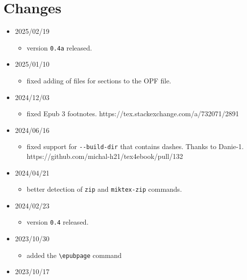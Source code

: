 \section{Changes}\label{changes}

\begin{itemize}
\item
  2025/02/19

  \begin{itemize}
  \tightlist
  \item
    version \texttt{0.4a} released.
  \end{itemize}
\item
  2025/01/10

  \begin{itemize}
  \tightlist
  \item
    fixed adding of files for sections to the OPF file.
  \end{itemize}
\item
  2024/12/03

  \begin{itemize}
  \tightlist
  \item
    fixed Epub 3 footnotes. https://tex.stackexchange.com/a/732071/2891
  \end{itemize}
\item
  2024/06/16

  \begin{itemize}
  \tightlist
  \item
    fixed support for \texttt{-\/-build-dir} that contains dashes.
    Thanks to Danie-1. https://github.com/michal-h21/tex4ebook/pull/132
  \end{itemize}
\item
  2024/04/21

  \begin{itemize}
  \tightlist
  \item
    better detection of \texttt{zip} and \texttt{miktex-zip} commands.
  \end{itemize}
\item
  2024/02/23

  \begin{itemize}
  \tightlist
  \item
    version \texttt{0.4} released.
  \end{itemize}
\item
  2023/10/30

  \begin{itemize}
  \tightlist
  \item
    added the \texttt{\textbackslash{}epubpage} command
  \end{itemize}
\item
  2023/10/17


\end{itemize}
